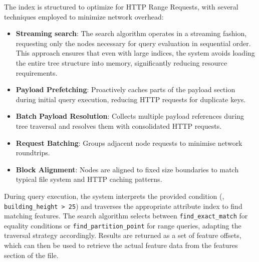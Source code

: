 The index is structured to optimize for HTTP Range Requests, with several techniques employed to minimize network overhead:

\begin{itemize}
  \item \textbf{Streaming search}: The search algorithm operates in a streaming fashion, requesting only the nodes necessary for query evaluation in sequential order. This approach ensures that even with large indices, the system avoids loading the entire tree structure into memory, significantly reducing resource requirements.
  \item \textbf{Payload Prefetching}: Proactively caches parts of the payload section during initial query execution, reducing HTTP requests for duplicate keys.
  \item \textbf{Batch Payload Resolution}: Collects multiple payload references during tree traversal and resolves them with consolidated HTTP requests.
  \item \textbf{Request Batching}: Groups adjacent node requests to minimise network roundtrips.
  \item \textbf{Block Alignment}: Nodes are aligned to fixed size boundaries to match typical file system and HTTP caching patterns.
\end{itemize}

During query execution, the system interprets the provided condition (\eg, \texttt{building\_height > 25}) and traverses the appropriate attribute index to find matching features. The search algorithm selects between \texttt{find\_exact\_match} for equality conditions or \texttt{find\_partition\_point} for range queries, adapting the traversal strategy accordingly. Results are returned as a set of feature offsets, which can then be used to retrieve the actual feature data from the features section of the file.
